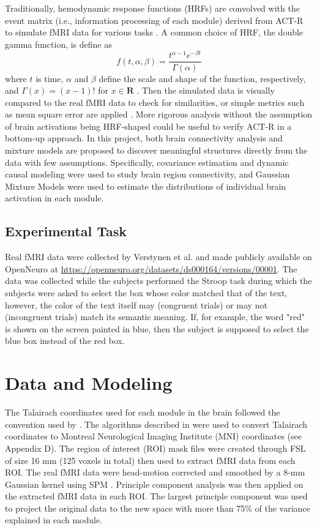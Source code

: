 \documentclass[10pt,letterpaper]{article}
\begin{document}
Traditionally, hemodynamic response functions (HRFs) are convolved with the event matrix (i.e., information processing of each module) derived from ACT-R to simulate fMRI data for various tasks \cite{Anderson2004,Lindquist2009}. A common choice of HRF, the double gamma function, is define as 
\[f(t, \alpha, \beta) = \frac{t^{\alpha - 1}e^{-\beta t}}{\Gamma(\alpha)}\]
where $t$ is time, $\alpha$ and $\beta$ define the scale and shape of the function, respectively, and $\Gamma(x) = (x - 1)!$ for $x \in \mathbf{R}$ \cite{Poldrack, Cignetti2016}. Then the simulated data is visually compared to the real fMRI data to check for similarities, or simple metrics such as mean square error are applied \cite{Anderson2004, Borst2017}. More rigorous analysis without the assumption of brain activations being HRF-shaped could be useful to verify ACT-R in a bottom-up approach. In this project, both brain connectivity analysis and mixture models are proposed to discover meaningful structures directly from the data with few assumptions. Specifically, covariance estimation and dynamic causal modeling were used to study brain region connectivity, and Gaussian Mixture Models were used to estimate the distributions of individual brain activation in each module.

\subsection{Experimental Task}
Real fMRI data were collected by Verstynen et al. \cite{Verstynen2014} and made publicly available on OpenNeuro at  \url{https://openneuro.org/datasets/ds000164/versions/00001}. The data was collected while the subjects performed the Stroop task \cite{Stroop1935} during which the subjects were asked to select the box whose color matched that of the text, however, the color of the text itself may (congruent trials) or may not (incongruent trials) match its semantic meaning. If, for example, the word "red" is shown on the screen painted in blue, then the subject is supposed to select the blue box instead of the red box.


\section{Data and Modeling}

The Talairach coordinates used for each module in the brain followed the convention used by \cite{Anderson2008, Borst2017}. The algorithms described in \cite{Lacadie2008} were used to convert Talairach coordinates to Montreal Neurological Imaging Institute (MNI) coordinates (see Appendix D). The region of interest (ROI) mask files were created through FSL \cite{Woolrich2009} of size 16 mm (125 voxels in total) then used to extract fMRI data from each ROI. The real fMRI data were head-motion corrected and smoothed by a 8-mm Gaussian kernel using SPM \cite{Penny2006}. Principle component analysis was then applied on the extracted fMRI data in each ROI. The largest principle component was used to project the original data to the new space with more than 75\% of the variance explained in each module.
\end{document}
